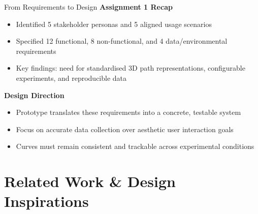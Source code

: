 \documentclass[aspectratio=169, 10pt]{beamer}
\begin{document}
\begin{frame}{From Requirements to Design}
  \textbf{Assignment 1 Recap}
  \begin{itemize}
    \item Identified 5 stakeholder personas and 5 aligned usage scenarios
    \item Specified 12 functional, 8 non-functional, and 4 data/environmental requirements
    \item Key findings: need for standardised 3D path representations, configurable experiments, and reproducible data
  \end{itemize}

  \vspace{0.5em}
  \textbf{Design Direction}
  \begin{itemize}
    \item Prototype translates these requirements into a concrete, testable system
    \item Focus on \alert{accurate data collection} over aesthetic user interaction goals
    \item Curves must remain consistent and trackable across experimental conditions
  \end{itemize}
\end{frame}

\section{Related Work \& Design Inspirations}
\end{document}
